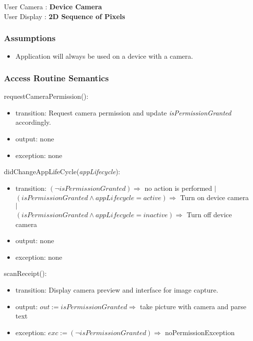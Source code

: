 \documentclass[12pt, titlepage]{article}
\begin{document}
User Camera : \textbf{Device Camera} \\
User Display : \textbf{2D Sequence of Pixels} 

\subsubsection{Assumptions}

\begin{itemize}
  \item Application will always be used on a device with a camera.
\end{itemize}

\subsubsection{Access Routine Semantics}

\noindent requestCameraPermission():
\begin{itemize}
  \item transition: Request camera permission and update \textit{isPermissionGranted} accordingly.
  \item output: none
  \item exception: none
  \end{itemize}

\noindent didChangeAppLifeCycle(\textit{appLifecycle}):
\begin{itemize}
  \item transition: $(\neg isPermissionGranted) \Rightarrow$ no action is performed $|$\\
                    $(isPermissionGranted \land appLifecycle = active) \Rightarrow$ Turn on device camera $|$\\
                    $(isPermissionGranted \land appLifecycle = inactive) \Rightarrow$ Turn off device camera
  \item output: none
  \item exception: none
\end{itemize}

\noindent scanReceipt():
\begin{itemize}
  \item transition: Display camera preview and interface for image capture.
  \item output: $out := isPermissionGranted \Rightarrow$ take picture with camera and parse text
  \item exception: $exc := (\neg isPermissionGranted) \Rightarrow$ noPermissionException
\end{itemize}
\end{document}
